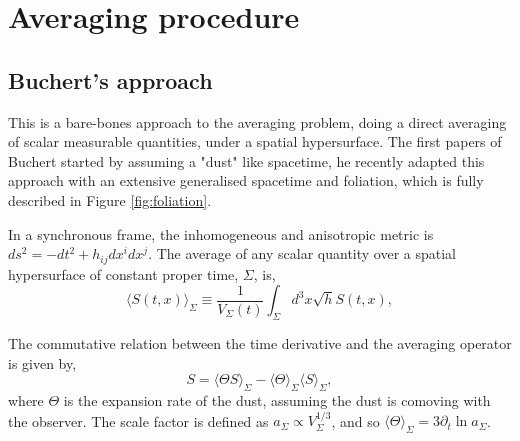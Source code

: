 \chapter{Averaging procedure}




\section{Buchert's approach}

This is a bare-bones approach to the averaging problem, doing a direct averaging of scalar measurable quantities, under a spatial hypersurface. The first papers of Buchert started by assuming a "dust" like spacetime\cite{Buchert_2000}\cite{Buchert_2001}, he recently adapted this approach with an extensive generalised spacetime\cite{Buchert_2020} and foliation, which is fully described in Figure \ref{fig:foliation}.
   
In a synchronous frame, the inhomogeneous and anisotropic metric is $ds^2=-dt^2+h_{ij}dx^idx^j$. The average of any scalar quantity over a spatial hypersurface of constant proper time, $\Sigma$, is,
\begin{equation}
	\langle S(t,x)\rangle_{\Sigma}\equiv \frac{1}{V_{\Sigma}(t)}\int_{\Sigma} d^3x \sqrt{h}S(t,x),
    \label{eqn:cbuchert_average}
\end{equation}

The commutative relation between the time derivative and the averaging operator is given by,
\begin{equation}
	[\partial_t \cdot, \langle\cdot \rangle_{\Sigma}] S=\langle \Theta S\rangle_{\Sigma}-\langle \Theta\rangle_{\Sigma}\langle S\rangle_{\Sigma},
	\label{eqn:comoving_commutation_rule_buchert}
\end{equation}
where $\Theta$ is the expansion rate of the dust, assuming the dust is comoving with the observer. The scale factor is defined as $a_{\Sigma}\propto V_{\Sigma}^{1/3}$, and so $\langle\Theta\rangle_{\Sigma}=3\partial_t \ln a_{\Sigma}$.










